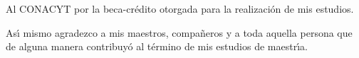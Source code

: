Al CONACYT por la beca-cr\'{e}dito otorgada para la
realizaci\'{o}n de mis estudios.

\vspace*{1.5in} As\'{\i} mismo agradezco a mis maestros, compa\~{n}eros y a
toda aquella persona que de alguna manera contribuy\'{o} al t\'{e}rmino de
mis estudios de maestr\'{\i}a.